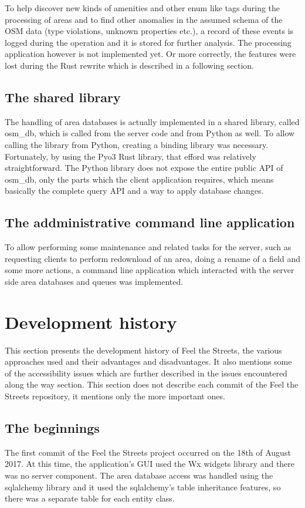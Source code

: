 \documentclass[nolof,digital]{fithesis3}
\begin{document}
To help discover new kinds of amenities and other enum like tags during the processing of areas and to find other anomalies in the assumed schema of the OSM data (type violations, unknown properties etc.), a record of these events is logged during the operation and it is stored for further analysis. The processing application however is not implemented yet. Or more correctly, the features were lost during the Rust rewrite which is described in a following section.
\subsection{The shared library}
The handling of area databases is actually implemented in a shared library, called osm_db, which is called from the server code and from Python as well. To allow calling the library from Python, creating a binding library was necessary. Fortunately, by using the Pyo3 Rust library, that efford was relatively straightforward. The Python library does not expose the entire public API of osm_db, only the parts which the client application requires, which means basically the complete query API and a way to apply database changes.
\subsection{The addministrative command line application}
To allow performing some maintenance and related tasks for the server, such as requesting clients to perform redownload of an area, doing a rename of a field and some more actions, a command line application which interacted with the server side area databases and queues was implemented.
\section{Development history}
This section presents the development history of Feel the Streets, the various approaches used and their advantages and disadvantages. It also mentions some of the accessibility issues which are further described in the issues encountered along the way section. This section does not describe each commit of the Feel the Streets repository, it mentions only the more important ones.
\subsection{The beginnings}
The first commit of the Feel the Streets project occurred on the 18th of August 2017. At this time, the application's GUI used the Wx widgets library and there was no server component. The area database access was handled using the sqlalchemy library and it used the sqlalchemy's table inheritance features, so there was a separate table for each entity class.
\end{document}
